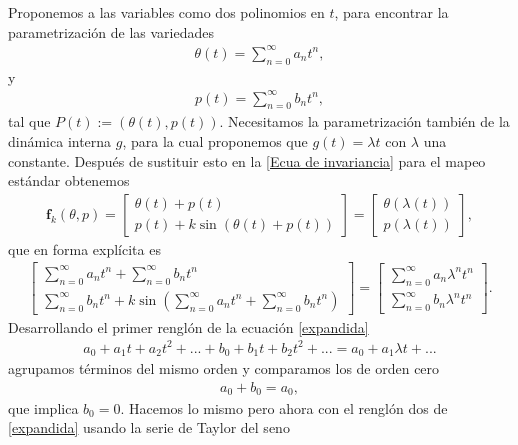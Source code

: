 Proponemos a las variables como dos polinomios en $t$, para encontrar la parametrización de las variedades
\begin{eqnarray}
\theta(t)=\sum_{n=0}^{\infty}a_{n}t^{n}  ,
\label{theta}
\end{eqnarray}
y
\begin{eqnarray}
p(t)=\sum_{n=0}^{\infty}b_{n}t^{n},
\label{p}
\end{eqnarray}
tal que $P(t):=(\theta(t),p(t))$. Necesitamos la parametrización también de la dinámica interna $g$, para la cual proponemos que $g(t)=\lambda t$ con $\lambda$ una constante. Después de sustituir esto en la \ref{Ecua de invariancia} para el mapeo estándar obtenemos
\begin{eqnarray}
\mathbf{f}_{k}(\theta,p) = \left[\begin{array}{c}
\theta(t) + p(t) \\
p(t) + k\sin(\theta(t) +p(t))
\end{array}\right] =\left[ \begin{array}{c}
\theta(\lambda(t)) \\
p(\lambda(t))
\end{array}\right], 
\label{sumas en mapeo}
\end{eqnarray}
que en forma explícita es
\begin{eqnarray}
\left[\begin{array}{c}
\sum_{n=0}^{\infty}a_{n}t^{n} + \sum_{n=0}^{\infty}b_{n}t^{n} \\
\sum_{n=0}^{\infty}b_{n}t^{n} + k\sin(\sum_{n=0}^{\infty}a_{n}t^{n} + \sum_{n=0}^{\infty}b_{n}t^{n})
\end{array}\right] =\left[ \begin{array}{c}
\sum_{n=0}^{\infty}a_{n}\lambda^{n}t^{n} \\
\sum_{n=0}^{\infty}b_{n}\lambda^{n}t^{n}
\end{array}\right].
\label{expandida}
\end{eqnarray}
Desarrollando el primer renglón de la ecuación \ref{expandida}
\begin{eqnarray}
a_{0}+a_{1}t+a_{2}t^{2}+... +b_{0}+b_{1}t+b_{2}t^{2}+ ...=a_{0}+a_{1}\lambda t+...
\label{primer renglon}
\end{eqnarray}
agrupamos términos del mismo orden y comparamos los de orden cero
\begin{eqnarray}
a_{0}+b_{0}=a_{0},
\end{eqnarray}
que implica $b_{0}=0$. Hacemos lo mismo pero ahora con el renglón dos de \ref{expandida} 
usando la serie de Taylor del seno
